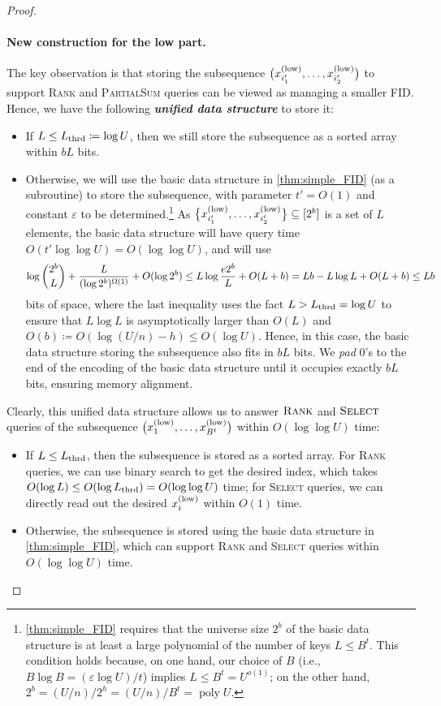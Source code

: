 \documentclass{article}
\theoremstyle{plain}
\theoremstyle{definition}  \newtheorem{definition}[theorem]{Definition}
\DeclarePairedDelimiter{\bk}{(}{)}
\DeclarePairedDelimiter{\BK}{\{}{\}}
\DeclareMathOperator{\poly}{poly}
\newcommand{\defeq}{\coloneqq}
\newcommand{\eps}{\varepsilon}
\newcommand{\xlow}[1][i]{x_{#1}^{(\textup{low})}}
\newcommand{\rank}{\textup{\textsc{Rank}}\xspace}
\newcommand{\select}{\textup{\textsc{Select}}\xspace}
\newcommand{\partialsum}{\textup{\textsc{PartialSum}}\xspace}
\newcommand{\Lthrd}{L_{\textup{thrd}}}
\newcommand{\defn}[1]{\emph{\textbf{#1}}}
\begin{document}
\begin{proof}
\paragraph*{New construction for the low part.}
The key observation is that storing the subsequence $\bk[\big]{\xlow[i'_1], \ldots, \xlow[i'_2]}$ to support \rank and \partialsum queries can be viewed as managing a smaller FID.
Hence, we have the following \defn{unified data structure} to store it:
\begin{itemize}
\item If $L \le \Lthrd \defeq \log U$,
  then we still store the subsequence as a sorted array within $bL$ bits.
\item Otherwise, we will use the basic data structure in \cref{thm:simple_FID} (as a subroutine)
  to store the subsequence, with parameter $t' = O(1)$ and constant $\eps$ to be determined.\footnote{\cref{thm:simple_FID} requires that the universe size $2^b$ of the basic data structure is at least a large polynomial of the number of keys $L \le B^t$. This condition holds because, on one hand, our choice of $B$ (i.e., $B \log B = (\eps \log U) / t$) implies $L \le B^t = U^{o(1)}$; on the other hand, $2^b = (U / n) / 2^h = (U / n) / B^t = \poly U$.}
  As $\BK[\big]{\xlow[i'_1], \ldots, \xlow[i'_2]} \subseteq [2^b]$ is a set of $L$ elements,
  the basic data structure will have query time $O(t' \log \log U) = O(\log \log U)$, and will use
  \begin{align*}
    \log \binom{2^b}{L} + \frac{L}{\bk{\log 2^b}^{\Omega \bk{1}}} + O(\log 2^b)
    \le L\log {\frac{e 2^b}{L}} + O(L + b)
    = Lb - L \log L + O(L + b)
    \le Lb
  \end{align*}
  bits of space, where the last inequality uses the fact $L > \Lthrd = \log U$ to ensure that $L\log L $ is asymptotically larger than $O(L)$ and $O(b) \defeq O(\log (U/n) - h) \le O(\log U)$.
  Hence, in this case, the basic data structure storing the subsequence also fits in $bL$ bits. We \emph{pad} 0's to the end of the encoding of the basic data structure until it occupies exactly $bL$ bits, ensuring memory alignment.
\end{itemize}
Clearly, this unified data structure allows us to answer $\rank$ and $\select$ queries of the subsequence $\bk[\big]{\xlow[1], \ldots, \xlow[B^t]}$ within $O(\log \log U)$ time:
\begin{itemize}
\item If $L \le \Lthrd$, then the subsequence is stored as a sorted array. For \rank queries, we can use binary search to get the desired index, which takes $O(\log L) \le O(\log \Lthrd) = O(\log \log U)$ time; for \select queries, we can directly read out the desired $\xlow$ within $O(1)$ time.
\item Otherwise, the subsequence is stored using the basic data structure in \cref{thm:simple_FID}, which can support \rank and \select queries within $O(\log \log U)$ time.
\end{itemize}


\end{proof}
\end{document}

